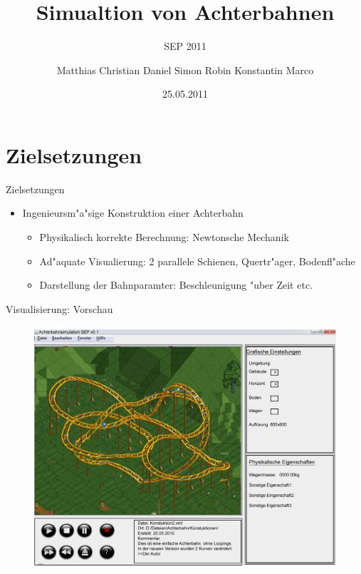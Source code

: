 \documentclass[
	ngerman,
	xcolor=dvipsnames,
	11pt
	]{beamer}
\title[SEP 2011]{Simualtion von Achterbahnen}
\subtitle{SEP 2011}
\author{\tiny{Matthias Christian Daniel Simon  Robin Konstantin Marco}}
\institute[TU-BS]{Technische Universit"at Carolo-Wilhelmina zu Braunschweig}
\date{25.05.2011}
\begin{document}
	\begin{frame}
		\titlepage
	\end{frame}
	
	
	\section{Zielsetzungen}
	\begin{frame}{Zielsetzungen}
	\begin{itemize}
	\item Ingenieursm"a"sige Konstruktion einer Achterbahn
		\begin{itemize}
			\item Physikalisch korrekte Berechnung: Newtonsche Mechanik
			\item Ad"aquate Visualierung: 2 parallele Schienen, Quertr"ager, Bodenfl"ache
			\item Darstellung der Bahnparamter: Beschleunigung "uber Zeit etc.
		\end{itemize}
		
	\end{itemize}

	\end{frame}
	
	

	
	\begin{frame}{Visualisierung: Vorschau}
		\begin{figure}
			\includegraphics[width=0.78\linewidth]{GUI_v3.jpg}
		\end{figure}
	\end{frame}
	
\end{document}
